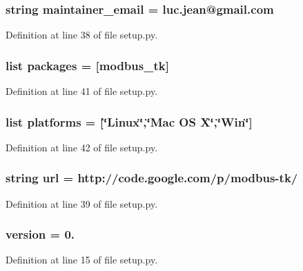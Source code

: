 \subsubsection[{maintainer\+\_\+email}]{\setlength{\rightskip}{0pt plus 5cm}string maintainer\+\_\+email = \textquotesingle{}luc.\+jean@gmail.\+com\textquotesingle{}}\label{namespacesetup_a86e671094264a948ff049175d4aac233}


Definition at line 38 of file setup.\+py.

\subsubsection[{packages}]{\setlength{\rightskip}{0pt plus 5cm}list packages = [\textquotesingle{}modbus\+\_\+tk\textquotesingle{}]}\label{namespacesetup_af290766b923d1fc3f429da7bc5decf7a}


Definition at line 41 of file setup.\+py.

\subsubsection[{platforms}]{\setlength{\rightskip}{0pt plus 5cm}list platforms = [\char`\"{}Linux\char`\"{},\char`\"{}Mac O\+S X\char`\"{},\char`\"{}Win\char`\"{}]}\label{namespacesetup_a6fe8ad87708c40336b3045c7bda755a0}


Definition at line 42 of file setup.\+py.

\subsubsection[{url}]{\setlength{\rightskip}{0pt plus 5cm}string url = \textquotesingle{}http\+://code.\+google.\+com/p/modbus-\/tk/\textquotesingle{}}\label{namespacesetup_aa03c1ef4c41f36b048cf58d5aade7653}


Definition at line 39 of file setup.\+py.

\subsubsection[{version}]{\setlength{\rightskip}{0pt plus 5cm}version = \textquotesingle{}0.\textquotesingle{}}\label{namespacesetup_a4c7a521b8f1a0769c09bfa4a1fca7dab}


Definition at line 15 of file setup.\+py.

